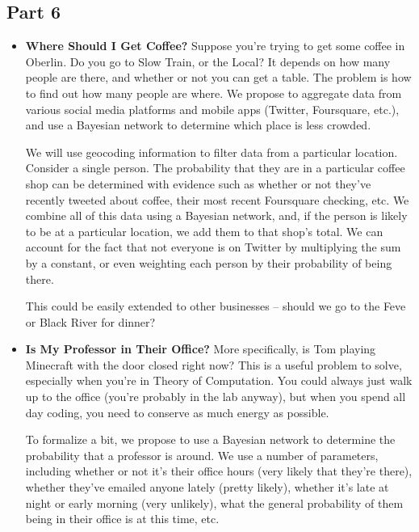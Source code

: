 \documentclass[11pt]{article}
\begin{document}
\subsection*{Part 6}
\begin{itemize}
\item \textbf{Where Should I Get Coffee?} Suppose you're trying to get some coffee in Oberlin. Do you go to Slow Train, or the Local? It depends on how many people are there, and whether or not you can get a table. The problem is how to find out how many people are where. We propose to aggregate data from various social media platforms and mobile apps (Twitter, Foursquare, etc.), and use a Bayesian network to determine which place is less crowded.

We will use geocoding information to filter data from a particular location. Consider a single person. The probability that they are in a particular coffee shop can be determined with evidence such as whether or not they've recently tweeted about coffee, their most recent Foursquare checking, etc. We combine all of this data using a Bayesian network, and, if the person is likely to be at a particular location, we add them to that shop's total. We can account for the fact that not everyone is on Twitter by multiplying the sum by a constant, or even weighting each person by their probability of being there.

This could be easily extended to other businesses -- should we go to the Feve or Black River for dinner?
\item \textbf{Is My Professor in Their Office?} More specifically, is Tom playing Minecraft with the door closed right now? This is a useful problem to solve, especially when you're in Theory of Computation. You could always just walk up to the office (you're probably in the lab anyway), but when you spend all day coding, you need to conserve as much energy as possible.
  
  To formalize a bit, we propose to use a Bayesian network to determine the probability that a professor is around. We use a number of parameters, including whether or not it's their office hours (very likely that they're there), whether they've emailed anyone lately (pretty likely), whether it's late at night or early morning (very unlikely), what the general probability of them being in their office is at this time, etc.
\end{itemize}
\end{document}
